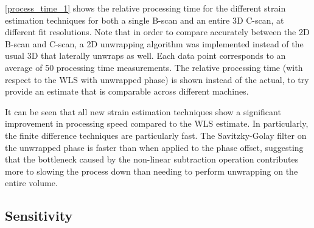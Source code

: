 \autoref{process_time_1} shows the relative processing time for the different strain estimation techniques for both a single B-scan and an entire 3D C-scan, at different fit resolutions. Note that in order to compare accurately between the 2D B-scan and C-scan, a 2D unwrapping algorithm was implemented instead of the usual 3D that laterally unwraps as well. Each data point corresponds to an average of 50 processing time measurements. 
The relative processing time (with respect to the WLS with unwrapped phase) is shown instead of the actual, to try provide an estimate that is comparable across different machines.

It can be seen that all new strain estimation techniques show a significant improvement in processing speed compared to the WLS estimate. In particularly, the finite difference techniques are particularly fast. The Savitzky-Golay filter on the unwrapped phase is faster than when applied to the phase offset, suggesting that the bottleneck caused by the non-linear subtraction operation contributes more to slowing the process down than needing to perform unwrapping on the entire volume. 

\subsection{Sensitivity}

